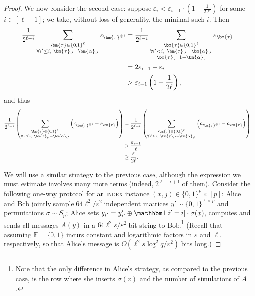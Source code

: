 \documentclass[a4paper,UKenglish,cleveref, autoref, thm-restate]{lipics-v2021}
\theoremstyle{definition}
\newcommand{\field}{\mathbb{F}}
\newcommand{\eps}{\varepsilon}
\newcommand{\bitset}{\{0,1\}}
\newcommand{\indexproblem}{\normalfont\textsc{index}\xspace}
\newcommand{\pcommitlength}{p}
\newcommand{\pcommitstring}{y}
\newcommand{\fieldsize}{q}
\newcommand{\chf}{\mathbbm 1}
\def\fe#1{
    \ifnum#1=1
        \alpha
    \else
    \ifnum#1=2
        \beta
    \else
    \ifnum#1=3
        \gamma
    \fi\fi\fi
}
\begin{document}
\begin{proof}
    We now consider the second case: suppose $\eps_i < \eps_{i - 1} \cdot \left(1 - \frac1{2\ell}\right)$ for some $i \in [\ell - 1]$; we take, without loss of generality, the minimal such $i$. Then
    \begin{align*}
        \frac1{2^{\ell - i}} \sum_{\substack{\bm{\tau} \in \bitset^{\ell} \\ \forall i' \leq i, ~ \bm{\tau}_{i'} = \bm{\fe1}_{i'}}} \eps_{\bm{\tau}^{\oplus i}} &= \frac1{2^{\ell - i}} \sum_{\substack{\bm{\tau} \in \bitset^{\ell} \\ \forall i' < i, ~ \bm{\tau}_{i'} = \bm{\fe1}_{i'}\\\bm{\tau}_i = 1 - \bm{\fe1}_i}} \eps_{\bm{\tau}} \\
        &= 2 \eps_{i - 1} - \eps_i\\
        &> \eps_{i - 1} \left(1 + \frac1{2\ell}\right),
    \end{align*}
    and thus
    \begin{align*}
        \frac1{2^{\ell - i}} \left(\sum_{\substack{\bm{\tau} \in \bitset^{\ell} \\ \forall i' \leq i, ~ \bm{\tau}_{i'} = \bm{\fe1}_{i'}}} \left(\eps_{\bm{\tau}^{\oplus i}} - \eps_{\bm{\tau}}\right)\right) &= \frac1{2^{\ell - i}}\left(\sum_{\substack{\bm{\tau} \in \bitset^{\ell} \\ \forall i' \leq i, ~ \bm{\tau}_{i'} = \bm{\fe1}_{i'}}} \left(a_{\bm{\tau}^{\oplus i}} - a_{\bm{\tau}}\right)\right)\\
        &> \frac{\eps_{i - 1}}{\ell}\\
        &\geq \frac{\eps}{2 \ell}.
    \end{align*}
    
    We will use a similar strategy to the previous case, although the expression we must estimate involves many more terms (indeed, $2^{\ell - i + 1}$ of them). Consider the following one-way protocol for an \indexproblem instance $(x, j) \in \bitset^\pcommitlength \times [\pcommitlength]$: Alice and Bob jointly sample $64 \ell^2/\eps^2$ independent matrices $\pcommitstring' \sim \bitset^{\ell \times \pcommitlength}$ and permutations $\sigma \sim S_\pcommitlength$; Alice sets $\pcommitstring_{i'} = \pcommitstring'_{i'} \oplus \chf[i' = i] \cdot \sigma(x)$, computes and sends all messages $A(\pcommitstring)$ in a $64 \ell^2s/\eps^2$-bit string to Bob.\footnote{Note that the only difference in Alice's strategy, as compared to the previous case, is the row where she inserts $\sigma(x)$ and the number of simulations of $A$.} (Recall that assuming $\field = \bitset$ incurs constant and logarithmic factors in $\eps$ and $\ell$, respectively, so that Alice's message is $O(\ell^2 s \log^2 \fieldsize / \eps^2)$ bits long.)
    

\end{proof}
\end{document}
